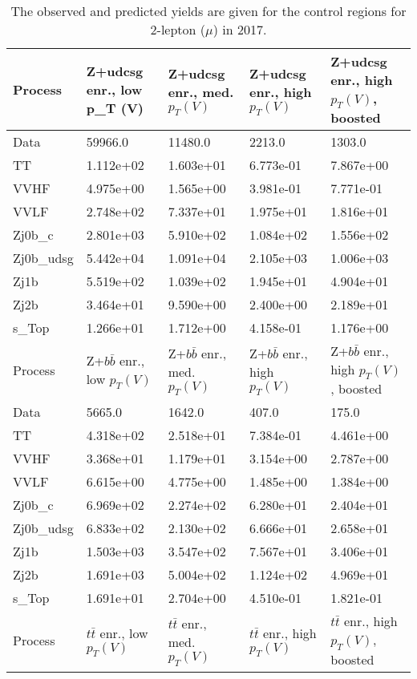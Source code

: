\begin{table}
\centering
\caption[2017 2-lepton ($\mu$) control region yields]{
                  The observed and predicted yields are given for the
                  control regions for 2-lepton ($\mu$) in 2017.
                  }
{\footnotesize
\begin{tabularx}{\textwidth}{|X|X|X|X|X|}
\hline
Process & Z+udcsg enr., low p_{T} (V) & Z+udcsg enr., med. $p_{T}(V)$ & Z+udcsg enr., high $p_{T}(V)$ & Z+udcsg enr., high $p_{T}(V)$, boosted \\
\hline
Data & 59966.0 & 11480.0 & 2213.0 & 1303.0 \\
\hline
TT & 1.112e+02 & 1.603e+01 & 6.773e-01 & 7.867e+00 \\
VVHF & 4.975e+00 & 1.565e+00 & 3.981e-01 & 7.771e-01 \\
VVLF & 2.748e+02 & 7.337e+01 & 1.975e+01 & 1.816e+01 \\
Zj0b\_c & 2.801e+03 & 5.910e+02 & 1.084e+02 & 1.556e+02 \\
Zj0b\_udsg & 5.442e+04 & 1.091e+04 & 2.105e+03 & 1.006e+03 \\
Zj1b & 5.519e+02 & 1.039e+02 & 1.945e+01 & 4.904e+01 \\
Zj2b & 3.464e+01 & 9.590e+00 & 2.400e+00 & 2.189e+01 \\
s\_Top & 1.266e+01 & 1.712e+00 & 4.158e-01 & 1.176e+00 \\
\hline
\hline
Process & Z+$b\bar{b}$ enr., low $p_{T}(V)$ & Z+$b\bar{b}$ enr., med. $p_{T}(V)$ & Z+$b\bar{b}$ enr., high $p_{T}(V)$ & Z+$b\bar{b}$ enr., high $p_{T}(V)$, boosted \\
\hline
Data & 5665.0 & 1642.0 & 407.0 & 175.0 \\
\hline
TT & 4.318e+02 & 2.518e+01 & 7.384e-01 & 4.461e+00 \\
VVHF & 3.368e+01 & 1.179e+01 & 3.154e+00 & 2.787e+00 \\
VVLF & 6.615e+00 & 4.775e+00 & 1.485e+00 & 1.384e+00 \\
Zj0b\_c & 6.969e+02 & 2.274e+02 & 6.280e+01 & 2.404e+01 \\
Zj0b\_udsg & 6.833e+02 & 2.130e+02 & 6.666e+01 & 2.658e+01 \\
Zj1b & 1.503e+03 & 3.547e+02 & 7.567e+01 & 3.406e+01 \\
Zj2b & 1.691e+03 & 5.004e+02 & 1.124e+02 & 4.969e+01 \\
s\_Top & 1.691e+01 & 2.704e+00 & 4.510e-01 & 1.821e-01 \\
\hline
\hline
Process & $t\bar{t}$ enr., low $p_{T}(V)$ & $t\bar{t}$ enr., med. $p_{T}(V)$ & $t\bar{t}$ enr., high $p_{T}(V)$ & $t\bar{t}$ enr., high $p_{T}(V)$, boosted \\

\end{tabularx}}
\end{table}
